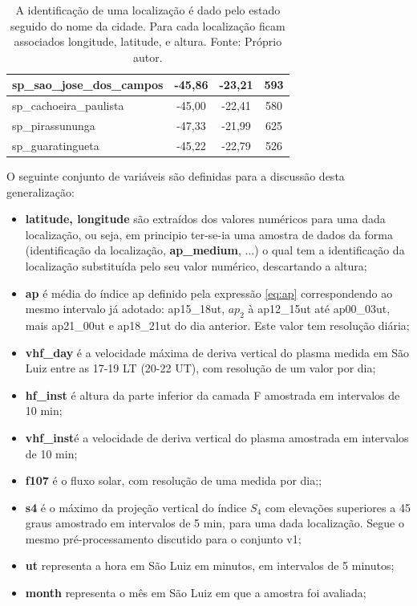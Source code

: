\begin{table}[H]
\begin{center}
\begin{tabular}{|l|c|c|c|}
sp\_sao\_jose\_dos\_campos  & -45,86  & -23,21  & 593 \\ \hline
sp\_cachoeira\_paulista   & -45,00  & -22,41  & 580 \\ \hline
sp\_pirassununga         & -47,33  & -21,99  & 625 \\ \hline
sp\_guaratingueta        & -45,22  & -22,79  & 526 \\ \hline
\end{tabular}
\end{center}
\vspace{12pt}
\caption{A identificação de uma localização é dado pelo estado seguido do nome da cidade. Para cada localização ficam associados longitude, latitude, e altura. Fonte: Próprio autor.}
\label{tab:stations}
\end{table}

O seguinte conjunto de variáveis são definidas para a discussão desta generalização:

\begin{itemize}
\item {\bf latitude, longitude} são extraídos dos valores numéricos para uma dada localização, ou seja, em principio ter-se-ia uma amostra de dados da forma (identificação da localização, {\bf ap\_medium}, ...) o qual tem a identificação da localização substituída pelo seu valor numérico, descartando a altura;
\item {\bf ap} é  média do índice ap definido pela expressão \ref{eq:ap} correspondendo ao mesmo intervalo já adotado: ap15\_18ut, $ap_2$ à ap12\_15ut até ap00\_03ut, mais ap21\_00ut e ap18\_21ut do dia anterior. Este valor tem resolução diária;
\item {\bf vhf\_day} é a velocidade máxima de deriva vertical do plasma medida em São Luiz entre as 17-19 LT (20-22 UT), com resolução de um valor por dia;
\item {\bf hf\_inst} é altura da parte inferior da camada F amostrada em intervalos de 10 min;
\item {\bf vhf\_inst}é a velocidade de deriva vertical do plasma amostrada em intervalos de 10 min;
\item {\bf f107}  é o fluxo solar, com resolução de uma medida por dia;;
\item {\bf s4} é o máximo da projeção vertical do índice $S_4$ com elevações superiores a 45 graus amostrado em intervalos de 5 min, para uma dada localização. Segue o mesmo pré-processamento discutido para o conjunto v1;
\item {\bf ut} representa a hora em São Luiz em minutos, em intervalos de 5 minutos;
\item {\bf month} representa o mês em São Luiz em que a amostra foi avaliada;
\end{itemize}


